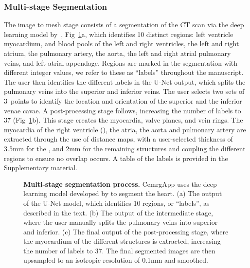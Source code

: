 \subsubsection{Multi-stage Segmentation}\label{sec:segmentation}
The image to mesh stage consists of a segmentation of the CT scan via the 
deep learning model by~\cite{hao2021_ccta}, Fig~\ref{fig:methods-segmentation}a, 
which identifies 10 distinct regions: 
left ventricle myocardium, and blood pools of the left and right ventricles, the left and right atrium, 
the pulmonary artery, the aorta, 
the left and right atrial pulmonary veins, and left atrial appendage. 
Regions are marked in the segmentation with different integer values,
we refer to these as ``labels'' throughout the manuscript.
The user then identifies the different labels in the U-Net output, which splits the pulmonary veins 
into the superior and inferior veins. 
The user selects two sets of 3~points to identify the location and orientation of 
the superior and the inferior venae cavae.
A post-processing stage follows, increasing the number of labels to 37 (Fig~\ref{fig:methods-segmentation}b). 
This stage creates the myocardia, valve planes, and vein rings. 
The myocardia of the right ventricle (\RV), the atria, the aorta and pulmonary artery are extracted
through the use of distance maps, with a user-selected thickness of 3.5mm for the \RV, and 
2mm for the remaining structures and coupling the different regions to ensure no overlap occurs.
A table of the labels is provided in the Supplementary material.

\begin{figure}[hbpt]
    \caption{
        \textbf{Multi-stage segmentation process. }
        CemrgApp uses the deep learning model developed by \cite{hao2021_ccta} to segment the heart. 
        (a) The output of the U-Net model, which identifies 10 regions, or ``labels'', 
        as described in the text.
        (b) The output of the intermediate stage, where the user manually 
        splits the pulmonary veins into superior and inferior.
        (c) The final output of the post-processing stage, where the myocardium of the different structures
        is extracted, increasing the number of labels to 37.
        The final segmented images are then upsampled to an isotropic resolution of 0.1mm and 
        smoothed.
    }
    \label{fig:methods-segmentation}
\end{figure}

